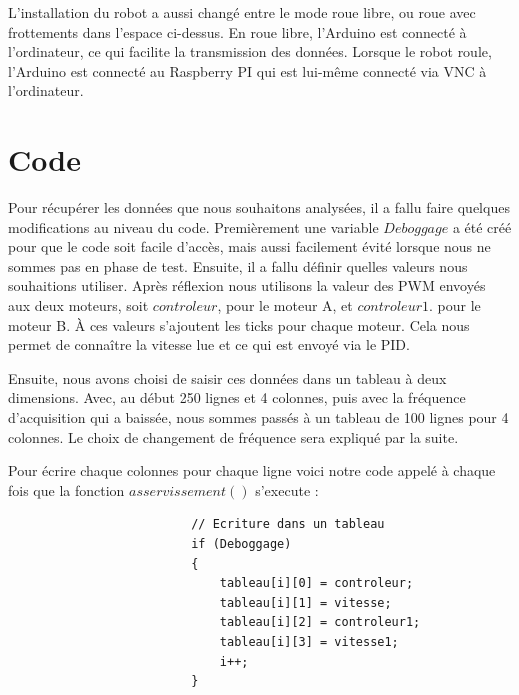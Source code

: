 \documentclass[
	a4paper,									%
	11pt,										%
	twoside,									%
	openright,									%
	notitlepage,									%
	parskip=half,								%
]{scrreprt}										%
\begin{document}
L'installation du robot a aussi changé entre le mode roue libre, ou roue avec frottements dans l'espace ci-dessus. En roue libre, 
l'Arduino est connecté à l'ordinateur, ce qui facilite la transmission des données. Lorsque le robot roule, l'Arduino est connecté 
au Raspberry PI qui est lui-même connecté via VNC à l'ordinateur. \par

\section{Code}

Pour récupérer les données que nous souhaitons analysées, il a fallu faire quelques modifications au niveau du code. Premièrement 
une variable $Deboggage$ a été créé pour que le code soit facile d'accès, mais aussi facilement évité lorsque nous ne sommes pas 
en phase de test. Ensuite, il a fallu définir quelles valeurs nous souhaitions utiliser. Après réflexion nous utilisons la valeur
des PWM envoyés aux deux moteurs, soit $controleur$, pour le moteur A, et $controleur1$. pour le moteur B. À ces valeurs 
s'ajoutent les ticks pour chaque moteur. Cela nous permet de connaître la vitesse lue et ce qui est envoyé via le PID. \par

Ensuite, nous avons choisi de saisir ces données dans un tableau à deux dimensions. Avec, au début 250 lignes et 4 colonnes, puis
avec la fréquence d'acquisition qui a baissée, nous sommes passés à un tableau de 100 lignes pour 4 colonnes. Le choix de changement
de fréquence sera expliqué par la suite. \par

Pour écrire chaque colonnes pour chaque ligne voici notre code appelé à chaque fois que la fonction $asservissement()$ s'execute : 

\vspace{3em}
\begin{figure}[!ht]
    \centering
    \begin{verbatim}
                    // Ecriture dans un tableau
                    if (Deboggage)
                    {
                        tableau[i][0] = controleur;
                        tableau[i][1] = vitesse;
                        tableau[i][2] = controleur1;
                        tableau[i][3] = vitesse1;
                        i++;
                    }
    \end{verbatim}
\end{figure}
\end{document}
